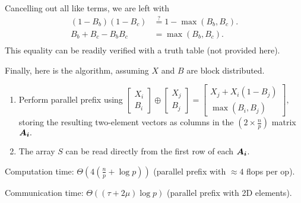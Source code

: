 \documentclass{article}
\newcommand{\aln}[1]{\begin{align*}#1\end{align*}}
\newcommand{\?}{\stackrel{?}{=}}
\begin{document}
Cancelling out all like terms, we are left with
\aln{
  (1-B_b)(1-B_c) &\? 1 - \max(B_b, B_c).\\
  B_b + B_c - B_bB_c &= \max(B_b, B_c).\\
}
This equality can be readily verified with a truth table (not provided here).

Finally, here is the algorithm, assuming $X$ and $B$ are block distributed.

\begin{enumerate}
  \item Perform parallel prefix using $\begin{bmatrix*}X_i\\B_i\end{bmatrix*} \oplus\begin{bmatrix*}X_j\\B_j\end{bmatrix*} = \begin{bmatrix*}X_j + X_i(1-B_j)\\\max(B_i, B_j)\end{bmatrix*},$ storing the resulting two-element vectors as columns in the $\left(2 \times \frac{n}{p}\right)$ matrix $\bm{A_i}.$
  \item The array $S$ can be read directly from the first row of each $\bm{A_i}$.
\end{enumerate}

\quad Computation time: $\Theta\left(4\left(\frac{n}{p} + \log{p}\right)\right)$ (parallel prefix with $\approx 4$ flops per op).

\quad Communication time: $\Theta(\left(\tau + 2\mu\right)\log{p})$ (parallel prefix with 2D elements).
\end{document}
